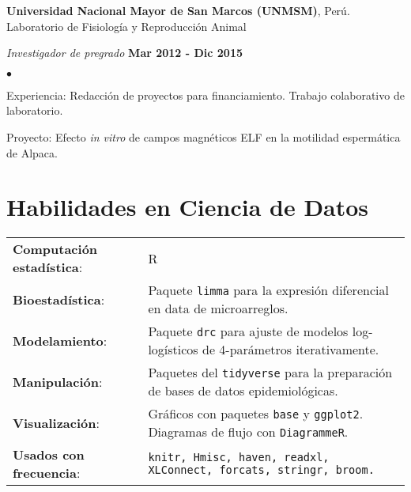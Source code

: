 \documentclass[margin,line]{res}
\newenvironment{list1}{
	\begin{list}{\ding{113}}{%
			\setlength{\itemsep}{0in}
			\setlength{\parsep}{0in} \setlength{\parskip}{0in}
			\setlength{\topsep}{0in} \setlength{\partopsep}{0in}
			\setlength{\leftmargin}{0.17in}}}{\end{list}}
\newenvironment{list2}{
	\begin{list}{$\bullet$}{%
			\setlength{\itemsep}{0in}
			\setlength{\parsep}{0in} \setlength{\parskip}{0in}
			\setlength{\topsep}{0in} \setlength{\partopsep}{0in}
			\setlength{\leftmargin}{0.2in}}}{\end{list}}
\begin{document}
\begin{resume}
		{\bf Universidad Nacional Mayor de San Marcos (UNMSM)}, Perú.\\
		Laboratorio de Fisiología y Reproducción Animal\\
		\vspace*{-.1in}
		\begin{list1}
			\item[] {\em Investigador de pregrado} \hfill {\bf Mar 2012 - Dic 2015}\\
			\vspace*{-.1in}
			\begin{list2}
				\item Experiencia: Redacción de proyectos para financiamiento. Trabajo colaborativo de laboratorio.
				\item Proyecto: Efecto \textit{in vitro} de campos magnéticos ELF en la motilidad espermática de Alpaca.\\
			\end{list2}
		\end{list1}
		
\section{\sc Habilidades en Ciencia de Datos}%
\begin{tabular}{ l l }
	{\bf Computación estadística}: & R\\
	{\bf Bioestadística}: & Paquete \texttt{limma} para la expresión diferencial en data de microarreglos.\\ 
	{\bf Modelamiento}: & Paquete \texttt{drc} para ajuste de modelos log-logísticos de 4-parámetros iterativamente.\\
	{\bf Manipulación}: & Paquetes del \texttt{tidyverse} para la preparación de bases de datos epidemiológicas.\\
	{\bf Visualización}: & Gráficos con paquetes \texttt{base} y \texttt{ggplot2}. Diagramas de flujo con \texttt{DiagrammeR}.\\ 
	{\bf Usados con frecuencia}: & \texttt{knitr, Hmisc, haven, readxl, XLConnect, forcats, stringr, broom.}\\	
\end{tabular}


\end{resume}
\end{document}
